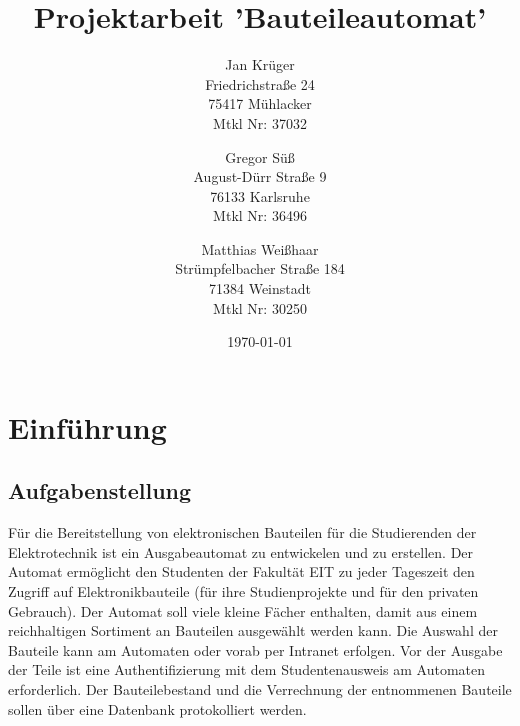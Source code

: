 \documentclass{scrartcl}
\begin{document}
\title{Projektarbeit 'Bauteileautomat'}
\author{
	Jan Krüger  \\
	Friedrichstraße 24 \\
	75417 Mühlacker \\
	Mtkl Nr: 37032 \\
	\and 
	Gregor Süß \\
	August-Dürr Straße 9 \\
	76133 Karlsruhe \\
	Mtkl Nr: 36496 \\
	\and
	Matthias Weißhaar \\
	Strümpfelbacher Straße 184\\
	71384 Weinstadt\\
	Mtkl Nr: 30250\\
	}

\date{\today}

\maketitle
\newpage

\tableofcontents
\newpage
\onehalfspace
\section{Einführung}
\subsection{Aufgabenstellung}
Für die Bereitstellung von elektronischen Bauteilen für die Studierenden der Elektrotechnik ist ein Ausgabeautomat zu entwickelen und zu erstellen. Der Automat ermöglicht den Studenten der Fakultät EIT zu jeder Tageszeit den Zugriff auf Elektronikbauteile (für ihre Studienprojekte und für den privaten Gebrauch). Der Automat soll viele kleine Fächer enthalten, damit aus einem reichhaltigen Sortiment an Bauteilen ausgewählt werden kann. Die Auswahl der Bauteile kann am Automaten oder vorab per Intranet erfolgen. Vor der Ausgabe der Teile ist eine Authentifizierung mit dem Studentenausweis am Automaten erforderlich. Der Bauteilebestand und die Verrechnung der entnommenen Bauteile sollen über eine Datenbank protokolliert werden. 
\end{document}
